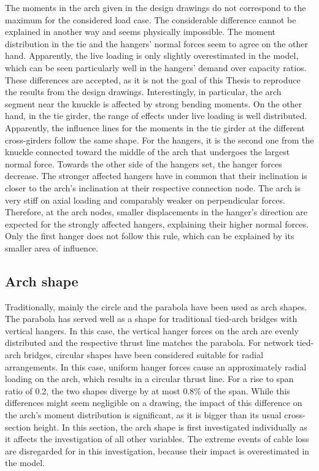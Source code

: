 The moments in the arch given in the design drawings do not correspond to the maximum for the considered load case. The considerable difference cannot be explained in another way and seems physically impossible. The moment distribution in the tie and the hangers' normal forces seem to agree on the other hand. Apparently, the live loading is only slightly overestimated in the model, which can be seen particularly well in the hangers' demand over capacity ratios. These differences are accepted, as it is not the goal of this Thesis to reproduce the results from the design drawings. Interestingly, in particular, the arch segment near the knuckle is affected by strong bending moments. On the other hand, in the tie girder, the range of effects under live loading is well distributed. Apparently, the influence lines for the moments in the tie girder at the different cross-girders follow the same shape. For the hangers, it is the second one from the knuckle connected toward the middle of the arch that undergoes the largest normal force. Towards the other side of the hangers set, the hanger forces decrease. The stronger affected hangers have in common that their inclination is closer to the arch's inclination at their respective connection node. The arch is very stiff on axial loading and comparably weaker on perpendicular forces. Therefore, at the arch nodes, smaller displacements in the hanger's direction are expected for the strongly affected hangers, explaining their higher normal forces. Only the first hanger does not follow this rule, which can be explained by its smaller area of influence. \medskip

\newpage
\subsection{Arch shape}
Traditionally, mainly the circle and the parabola have been used as arch shapes. The parabola has served well as a shape for traditional tied-arch bridges with vertical hangers. In this case, the vertical hanger forces on the arch are evenly distributed and the respective thrust line matches the parabola. For network tied-arch bridges, circular shapes have been considered suitable for radial arrangements. In this case, uniform hanger forces cause an approximately radial loading on the arch, which results in a circular thrust line. For a rise to span ratio of 0.2, the two shapes diverge by at most 0.8\% of the span. While this differences might seem negligible on a drawing, the impact of this difference on the arch's moment distribution is significant, as it is bigger than its usual cross-section height. In this section, the arch shape is first investigated individually as it affects the investigation of all other variables. The extreme events of cable loss are disregarded for in this investigation, because their impact is overestimated in the model. \medskip

